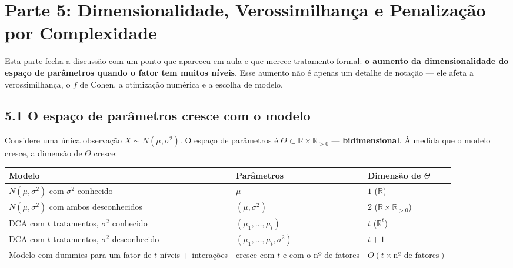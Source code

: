 \documentclass[
]{article}
\newcounter{none} %
\begin{document}
\section{Parte 5: Dimensionalidade, Verossimilhança e Penalização por
Complexidade}\label{parte-5-dimensionalidade-verossimilhanuxe7a-e-penalizauxe7uxe3o-por-complexidade}

Esta parte fecha a discussão com um ponto que apareceu em aula e que
merece tratamento formal: \textbf{o aumento da dimensionalidade do
espaço de parâmetros quando o fator tem muitos níveis}. Esse aumento não
é apenas um detalhe de notação --- ele afeta a verossimilhança, o \(f\)
de Cohen, a otimização numérica e a escolha de modelo.

\subsection{5.1 O espaço de parâmetros cresce com o
modelo}\label{o-espauxe7o-de-paruxe2metros-cresce-com-o-modelo}

Considere uma única observação \(X \sim N(\mu, \sigma^2)\). O espaço de
parâmetros é \(\Theta \subset \mathbb{R} \times \mathbb{R}_{>0}\) ---
\textbf{bidimensional}. À medida que o modelo cresce, a dimensão de
\(\Theta\) cresce:

{\def\LTcaptype{none} %
\begin{longtable}[]{@{}
  >{\raggedright\arraybackslash}p{}
  >{\raggedright\arraybackslash}p{}
  >{\raggedright\arraybackslash}p{}@{}}
\toprule\noalign{}
\begin{minipage}[b]{\linewidth}\raggedright
Modelo
\end{minipage} & \begin{minipage}[b]{\linewidth}\raggedright
Parâmetros
\end{minipage} & \begin{minipage}[b]{\linewidth}\raggedright
Dimensão de \(\Theta\)
\end{minipage} \\
\midrule\noalign{}
\endhead
\bottomrule\noalign{}
\endlastfoot
\(N(\mu, \sigma^2)\) com \(\sigma^2\) conhecido & \(\mu\) & \(1\)
(\(\mathbb{R}\)) \\
\(N(\mu, \sigma^2)\) com ambos desconhecidos & \((\mu, \sigma^2)\) &
\(2\) (\(\mathbb{R} \times \mathbb{R}_{>0}\)) \\
DCA com \(t\) tratamentos, \(\sigma^2\) conhecido &
\((\mu_1,\dots,\mu_t)\) & \(t\) (\(\mathbb{R}^t\)) \\
DCA com \(t\) tratamentos, \(\sigma^2\) desconhecido &
\((\mu_1,\dots,\mu_t, \sigma^2)\) & \(t+1\) \\
Modelo com dummies para um fator de \(t\) níveis + interações & cresce
com \(t\) e com o nº de fatores &
\(O(t \times \text{nº de fatores})\) \\
\end{longtable}
}
\end{document}
